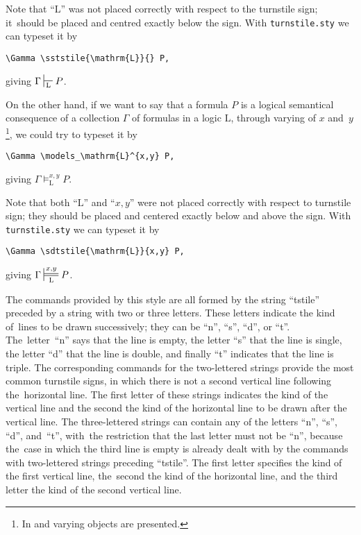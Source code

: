 \documentclass{pracjourn}
\begin{document}
\medskip

Note that ``$\mathrm{L}$'' was not placed correctly with respect to the turnstile sign; it~should be placed and centred exactly below the sign. With \texttt{turnstile.sty} we can typeset it by \begin{verbatim}\Gamma \sststile{\mathrm{L}}{} P,\end{verbatim} giving $\Gamma \sststile{\mathrm{L}}{} P$.

\medskip

On the other hand, if we want to say that a formula $P$ is a logical semantical consequence of a collection $\Gamma$ of formulas in a logic $\mathrm{L}$, through varying of $x$ and~$y$\footnote{In \cite{BuchsbaumBeziau2004} and \cite{BuchsbaumPequeno1997} varying objects are presented.}, we could try to typeset it by \begin{verbatim}\Gamma \models_\mathrm{L}^{x,y} P,\end{verbatim} giving $\Gamma \models_\mathrm{L}^{x,y} P$.

\medskip

Note that both ``$\mathrm{L}$'' and ``$x,y$'' were not placed correctly with respect to turnstile sign; they should be placed and centered exactly below and above the sign. With \texttt{turnstile.sty} we can typeset it by \begin{verbatim}\Gamma \sdtstile{\mathrm{L}}{x,y} P,\end{verbatim} giving $\Gamma \sdtstile{\mathrm{L}}{x,y} P$.

\medskip


The commands provided by this style are all formed by the string ``tstile'' preceded by a string with two or three letters. These letters indicate the kind of~lines to be drawn successively; they can be ``n'', ``s'', ``d'', or ``t''. The~letter~``n'' says that the line is empty, the letter ``s'' that the line is single, the letter ``d'' that the line is double, and finally ``t'' indicates that the line is triple. The corresponding commands for the two-lettered strings provide the most common turnstile signs, in which there is not a second vertical line following the~horizontal line. The first letter of these strings indicates the kind of the vertical line and the second the kind of the horizontal line to be drawn after the vertical line. The three-lettered strings can contain any of the letters ``n'', ``s'', ``d'', and~``t'', with~the restriction that the last letter must not be ``n'', because the~case in which the third line is empty is already dealt with by the commands with two-lettered strings preceding ``tstile''. The first letter specifies the kind of the first vertical line, the~second the kind of the horizontal line, and the third letter the kind of the second vertical line.
\end{document}
